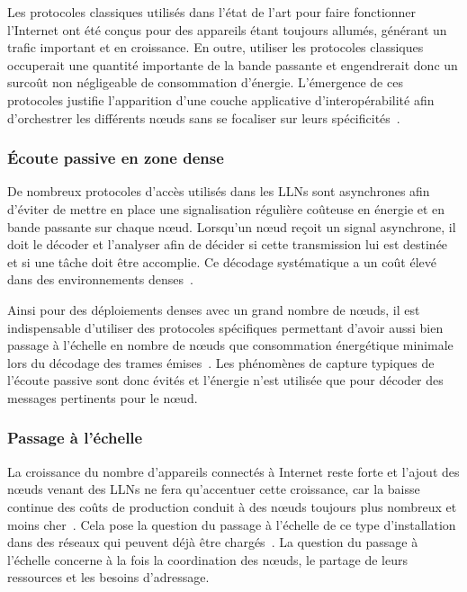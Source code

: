 Les protocoles classiques utilisés dans l'état de l'art pour faire fonctionner l'Internet ont été conçus pour des appareils étant toujours allumés, générant un trafic important et en croissance.
En outre, utiliser les protocoles classiques occuperait une quantité importante de la bande passante et engendrerait donc un surcoût non négligeable de consommation d'énergie.
L'émergence de ces protocoles justifie l'apparition d'une couche applicative d'interopérabilité afin d'orchestrer les différents nœuds sans se focaliser sur leurs spécificités~\cite{van2008achieving}.

\subsubsection{Écoute passive en zone dense}

De nombreux protocoles d'accès utilisés dans les \ac{LLN}s sont asynchrones afin d'éviter de mettre en place une signalisation régulière coûteuse en énergie et en bande passante sur chaque nœud.
Lorsqu'un nœud reçoit un signal asynchrone, il doit le décoder et l'analyser afin de décider si cette transmission lui est destinée et si une tâche doit être accomplie.
Ce décodage systématique a un coût élevé dans des environnements denses~\cite{langendoen2008medium}.


Ainsi pour des déploiements denses avec un grand nombre de nœuds, il est indispensable d'utiliser des protocoles spécifiques permettant d'avoir aussi bien passage à l'échelle en nombre de nœuds que consommation énergétique minimale lors du décodage des trames émises~\cite{6tisch}.
Les phénomènes de capture typiques de l'écoute passive sont donc évités et l'énergie n'est utilisée que pour décoder des messages pertinents pour le nœud.

\subsubsection{Passage à l'échelle}

La croissance du nombre d'appareils connectés à Internet reste forte et l'ajout des nœuds venant des \ac{LLN}s ne fera qu'accentuer cette croissance, car la baisse continue des coûts de production conduit à des nœuds toujours plus nombreux et moins cher~\cite{tan2010future, loomis2012forecasting}.
Cela pose la question du passage à l'échelle de ce type d'installation dans des réseaux qui peuvent déjà être chargés~\cite{murugesan2008harnessing,brownlee2002understanding,bandyopadhyay2011internet}.
La question du passage à l'échelle concerne à la fois la coordination des nœuds, le partage de leurs ressources et les besoins d'adressage.

